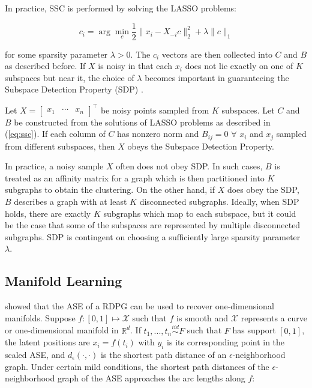 \documentclass[
  11pt,
]{article}
\begin{document}
In practice, SSC is performed by solving the LASSO problems:

\begin{equation} \label{eq:ssc}
c_i = \arg\min_c \frac{1}{2} \|x_i - X_{-i} c \|_2^2 + \lambda \|c\|_1
\end{equation}

for some sparsity parameter \(\lambda > 0\). The \(c_i\) vectors are
then collected into \(C\) and \(B\) as described before. If \(X\) is
noisy in that each \(x_i\) does not lie exactly on one of \(K\)
subspaces but near it, the choice of \(\lambda\) becomes important in
guaranteeing the Subspace Detection Property (SDP)
\cite{jmlr-v28-wang13}.

\begin{definition} 
Let $X = \begin{bmatrix} x_1 & \cdots & x_n \end{bmatrix}^\top$ be noisy 
points sampled from $K$ subspaces. Let $C$ and $B$ be constructed from the 
solutions of LASSO problems as described in (\ref{eq:ssc}). If each column of 
$C$ has nonzero norm and $B_{ij} = 0$ $\forall$ $x_i$ and $x_j$ sampled from 
different subspaces, then $X$ obeys the Subspace Detection Property. 
\end{definition}

\begin{remark} 
In practice, a noisy sample $X$ often does not obey SDP. 
In such cases, $B$ is treated as an affinity matrix for a graph which 
is then partitioned into $K$ subgraphs to obtain the clustering. On the other 
hand, if $X$ does obey the SDP, $B$ describes a graph 
with at least $K$ disconnected subgraphs. Ideally, when SDP holds, 
there are exactly $K$ subgraphs which map to each subspace, 
but it could be the case that some of the subspaces are represented by 
multiple disconnected subgraphs. SDP is contingent 
on choosing a sufficiently large sparsity parameter $\lambda$. 
\end{remark}

\hypertarget{manifold-learning}{%
\subsection{Manifold Learning}\label{manifold-learning}}

\citet{trosset2020learning} showed that the ASE of a RDPG can be used to
recover one-dimensional manifolds. Suppose
\(f : [0, 1] \mapsto \mathcal{X}\) such that \(f\) is smooth and
\(\mathcal{X}\) represents a curve or one-dimensional manifold in
\(\mathbb{R}^d\). If \(t_1, ..., t_n \stackrel{iid}{\sim} F\) such that
\(F\) has support \([0, 1]\), the latent positions are \(x_i = f(t_i)\)
with \(y_i\) is its corresponding point in the scaled ASE, and
\(d_{\epsilon}(\cdot, \cdot)\) is the shortest path distance of an
\(\epsilon\)-neighborhood graph. Under certain mild conditions, the
shortest path distances of the \(\epsilon\)-neighborhood graph of the
ASE approaches the arc lengths along \(f\):
\end{document}

